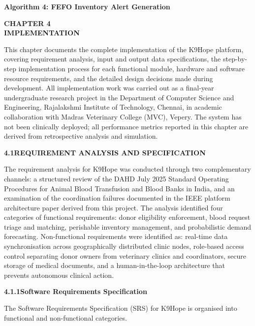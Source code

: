 \documentclass[12pt,a4paper]{article}
\begin{document}
\noindent\textbf{Algorithm 4: FEFO Inventory Alert Generation}

\newpage
\begin{center}
    \textbf{\large CHAPTER 4}\\[0.4em]
    \textbf{\large IMPLEMENTATION}
\end{center}
\vspace{1.5em}

\noindent This chapter documents the complete implementation of the K9Hope platform, covering requirement analysis, input and output data specifications, the step-by-step implementation process for each functional module, hardware and software resource requirements, and the detailed design decisions made during development. All implementation work was carried out as a final-year undergraduate research project in the Department of Computer Science and Engineering, Rajalakshmi Institute of Technology, Chennai, in academic collaboration with Madras Veterinary College (MVC), Vepery. The system has not been clinically deployed; all performance metrics reported in this chapter are derived from retrospective analysis and simulation.

\vspace{1.5em}
\noindent\textbf{4.1\quad REQUIREMENT ANALYSIS AND SPECIFICATION}
\vspace{0.6em}

\noindent The requirement analysis for K9Hope was conducted through two complementary channels: a structured review of the DAHD July 2025 Standard Operating Procedures for Animal Blood Transfusion and Blood Banks in India, and an examination of the coordination failures documented in the IEEE platform architecture paper derived from this project. The analysis identified four categories of functional requirements: donor eligibility enforcement, blood request triage and matching, perishable inventory management, and probabilistic demand forecasting. Non-functional requirements were identified as: real-time data synchronisation across geographically distributed clinic nodes, role-based access control separating donor owners from veterinary clinics and coordinators, secure storage of medical documents, and a human-in-the-loop architecture that prevents autonomous clinical action.

\vspace{1.5em}
\noindent\textbf{4.1.1\quad Software Requirements Specification}
\vspace{0.6em}

\noindent The Software Requirements Specification (SRS) for K9Hope is organised into functional and non-functional categories.
\end{document}
